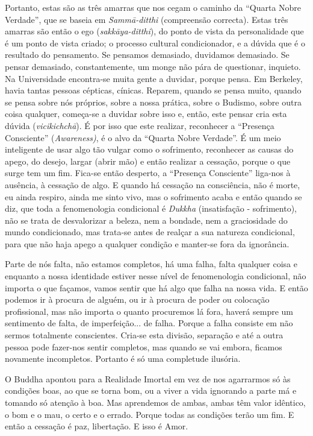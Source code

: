 Portanto, estas são as três amarras que nos cegam o caminho da ``Quarta
Nobre Verdade'', que se baseia em \emph{Sammā-ditthi} (compreensão
correcta). Estas três amarras são então o ego (\emph{sakkāya-ditthi}),
do ponto de vista da personalidade que é um ponto de vista criado; o
processo cultural condicionador, e a dúvida que é o resultado do
pensamento. Se pensamos demasiado, duvidamos demasiado. Se pensar
demasiado, constantemente, um monge não pára de questionar, inquieto. Na
Universidade encontra-se muita gente a duvidar, porque pensa. Em
Berkeley, havia tantas pessoas cépticas, cínicas. Reparem, quando se
pensa muito, quando se pensa sobre nós próprios, sobre a nossa prática,
sobre o Budismo, sobre outra coisa qualquer, começa-se a duvidar sobre
isso e, então, este pensar cria esta dúvida (\emph{vicikichchā}). É por
isso que este realizar, reconhecer a ``Presença Consciente''
(\emph{Awareness)}, é o alvo da ``Quarta Nobre Verdade''. É um meio
inteligente de usar algo tão vulgar como o sofrimento, reconhecer as
causas do apego, do desejo, largar (abrir mão) e então realizar a
cessação, porque o que surge tem um fim. Fica-se então desperto, a
``Presença Consciente'' liga-nos à ausência, à cessação de algo. E
quando há cessação na consciência, não é morte, eu ainda respiro, ainda
me sinto vivo, mas o sofrimento acaba e então quando se diz, que toda a
fenomenologia condicional é \emph{Dukkha} (insatisfação - sofrimento),
não se trata de desvalorizar a beleza, nem a bondade, nem a graciosidade
do mundo condicionado, mas trata-se antes de realçar a sua natureza
condicional, para que não haja apego a qualquer condição e manter-se
fora da ignorância.

Parte de nós falta, não estamos completos, há uma falha, falta qualquer
coisa e enquanto a nossa identidade estiver nesse nível de fenomenologia
condicional, não importa o que façamos, vamos sentir que há algo que
falha na nossa vida. E então podemos ir à procura de alguém, ou ir à
procura de poder ou colocação profissional, mas não importa o quanto
procuremos lá fora, haverá sempre um sentimento de falta, de
imperfeição... de falha. Porque a falha consiste em não sermos
totalmente conscientes. Cria-se esta divisão, separação e até a outra
pessoa pode fazer-nos sentir completos, mas quando se vai embora,
ficamos novamente incompletos. Portanto é só uma completude ilusória.

O Buddha apontou para a Realidade Imortal em vez de nos agarrarmos só às
condições boas, ao que se torna bom, ou a viver a vida ignorando a parte
má e tomando só atenção à boa. Mas aprendemos de ambas, ambas têm valor
idêntico, o bom e o mau, o certo e o errado. Porque todas as condições
terão um fim. E então a cessação é paz, libertação. E isso é Amor.

